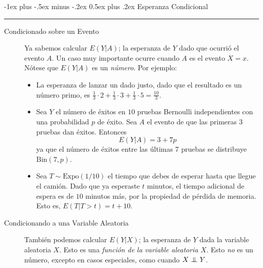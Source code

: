 \documentclass[12,landscape]{article}
\makeatletter
\newcommand\independent{\protect\mathpalette{\protect\independenT}{\perp}}
\def\independenT#1#2{\mathrel{\setbox0\hbox{$#1#2$}%
    \copy0\kern-\wd0\mkern4mu\box0}}
\newcommand{\Bin}{\textrm{Bin}}
\newcommand{\Expo}{\textrm{Expo}}
\renewcommand{\section}{\@startsection{section}{1}{0mm}%
                                {-1ex plus -.5ex minus -.2ex}%
                                {0.5ex plus .2ex}%
                                {\normalfont\large\bfseries}}
\makeatother
\begin{document}
\begin{multicols*}{3}
\section{Esperanza Condicional}\smallskip \hrule height 2pt \smallskip
\begin{description}
    \item[Condicionado sobre un Evento] Ya sabemos calcular $E(Y|A)$; la esperanza de $Y$ dado que ocurrió el evento $A$. Un caso muy importante ocurre cuando $A$ es el evento $X=x$. Nótese que $E(Y|A)$ es un \emph{número}. Por ejemplo:
    \begin{itemize}
    \item La esperanza de lanzar un dado justo, dado que el resultado es un número primo, es $\frac{1}{3} \cdot 2 + \frac{1}{3} \cdot 3 + \frac{1}{3} \cdot 5 = \frac{10}{3}$.
    \item Sea $Y$ el número de éxitos en $10$ pruebas Bernoulli independientes con una probabilidad $p$ de éxito. Sea $A$ el evento de que las primeras 3 pruebas dan éxitos. Entonces
    $$E(Y|A) = 3 + 7p$$
    ya que el número de éxitos entre las últimas 7 pruebas se distribuye $\Bin(7,p)$.
    \item Sea $T \sim \Expo(1/10)$ el tiempo que debes de esperar hasta que llegue el camión. Dado que ya esperaste $t$ minutos, el tiempo adicional de espera es de $10$ minutos más, por la propiedad de pérdida de memoria. Esto es, $E(T|T>t) = t + 10$.
    \end{itemize}
\end{description}
        \medskip
        
\begin{description}
    \item[Condicionando a una Variable Aleatoria] También podemos calcular $E(Y|X)$; la esperanza de $Y$ dada la variable aleatoria $X$. Esto es una \emph{función de la variable aleatoria $X$}. Esto \emph{no} es un número, excepto en casos especiales, como cuando $X \independent Y$.


\end{description}
\end{multicols*}
\end{document}
